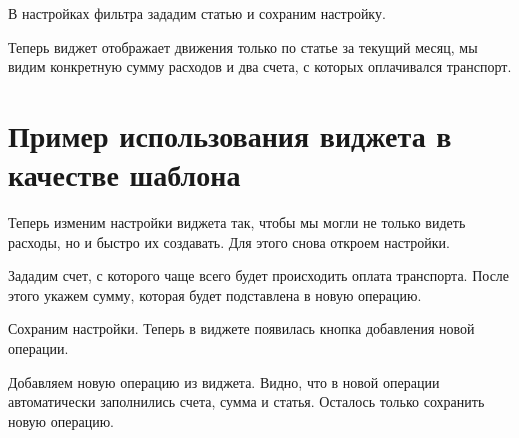 \documentclass[a4paper,10pt,russian]{sphinxmanual}
\begin{document}
\noindent{}

\noindent{}

В настройках фильтра зададим статью  и сохраним настройку.

\noindent{}

Теперь виджет отображает движения только по статье  за текущий месяц, мы видим
конкретную сумму расходов и два счета, с которых оплачивался транспорт.


\section{Пример использования виджета в качестве шаблона}
\label{\detokenize{widgets:id6}}
Теперь изменим настройки виджета так, чтобы мы могли не только видеть расходы, но и быстро их создавать. Для
этого снова откроем настройки.

\noindent{}

\noindent{}

\noindent{}

Зададим счет, с которого чаще всего будет происходить оплата транспорта. После этого укажем сумму, которая будет
подставлена в новую операцию.

\noindent{}

\noindent{}

\noindent{}

Сохраним настройки. Теперь в виджете появилась кнопка добавления новой операции.

\noindent{}

Добавляем новую операцию из виджета. Видно, что в новой операции автоматически заполнились счета, сумма и статья. Осталось
только сохранить новую операцию.
\end{document}
